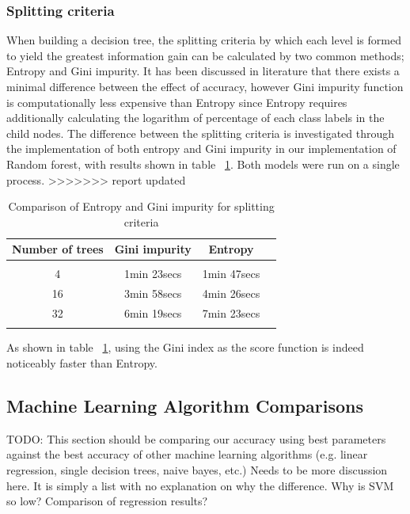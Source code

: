 \documentclass{article} %
\begin{document}
\subsubsection{Splitting criteria}

When building a decision tree, the splitting criteria by which each level is formed to yield the greatest information gain can be calculated by two common methods; Entropy and Gini impurity. It has been discussed in literature that there exists a minimal difference between the effect of accuracy, however Gini impurity function is computationally less expensive than Entropy since Entropy requires additionally calculating the logarithm of percentage of each class labels in the child nodes. The difference between the splitting criteria is investigated through the implementation of both entropy and Gini impurity in our implementation of Random forest, with results shown in table ~\ref{ent-gini}. Both models were run on a single process.
>>>>>>> report updated

\begin{table}[h]
\caption{Comparison of Entropy and Gini impurity for splitting criteria}
\begin{center}
\begin{tabular}{cccc}
{\bf Number of trees} &{\bf Gini impurity} &{\bf Entropy}
\\ \hline \\
4	&1min 23secs    &1min 47secs\\
16	&3min 58secs    &4min 26secs\\
32	&6min 19secs    &7min 23secs\\
\label{ent-gini}
\end{tabular}
\end{center}
\end{table}

As shown in table ~\ref{ent-gini}, using the Gini index as the score function is indeed noticeably faster than Entropy.


\subsection{Machine Learning Algorithm Comparisons}
TODO:  This section should be comparing our accuracy using best parameters against the best accuracy of other machine learning algorithms (e.g. linear regression, single decision trees, naive bayes, etc.)
Needs to be more discussion here. It is simply a list with no explanation on why the difference. Why is SVM so low? Comparison of regression results?
\end{document}
